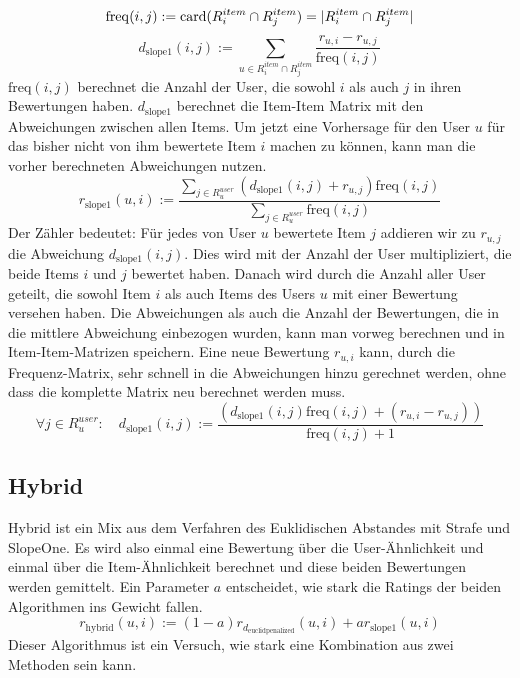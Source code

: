 \begin{equation}
\mathrm{freq}(i,j) := \mathrm{card}(R^{item}_{i} \cap R^{item}_{j})=|R^{item}_{i} \cap R^{item}_{j}|\\
\end{equation}
\begin{equation}
 d_{\mathrm{slope1}}(i,j) := \sum\limits_{u\in R^{item}_{i} \cap R^{item}_{j}}\dfrac{r_{u,i}-r_{u,j}}  {\mathrm{freq}(i,j)} 	\label{deviation}
\end{equation}	
$\mathrm{freq}(i,j)$ berechnet die Anzahl der User, die sowohl $i$ als auch $j$ in ihren Bewertungen haben. $d_{\mathrm{slope1}}$ berechnet die Item-Item Matrix mit den Abweichungen zwischen allen Items. 
Um jetzt eine Vorhersage für den User $u$ für das bisher nicht von ihm bewertete Item $i$ machen zu können, kann man die vorher berechneten Abweichungen nutzen.
\begin{equation}
 r_{\mathrm{slope1}}(u,i) := \dfrac{\sum\limits_{j\in R^{user}_{u}}( d_{\mathrm{slope1}}(i,j)+r_{u,j})\mathrm{freq}(i,j)}  {\sum\limits_{j\in R^{user}_{u}}\mathrm{freq}(i,j)} 	\label{slopeone}
\end{equation}
Der Zähler bedeutet: Für jedes von User $u$ bewertete Item $j$ addieren wir zu $r_{u,j}$ die Abweichung $d_{\mathrm{slope1}}(i,j)$. Dies wird mit der Anzahl der User multipliziert, die beide Items $i$ und $j$ bewertet haben. Danach wird durch die Anzahl aller User geteilt, die sowohl Item $i$ als auch Items des Users $u$ mit einer Bewertung versehen haben. Die Abweichungen als auch die Anzahl der Bewertungen, die in die mittlere Abweichung einbezogen wurden, kann man vorweg berechnen und in Item-Item-Matrizen speichern. Eine neue Bewertung $r_{u,i}$ kann, durch die Frequenz-Matrix, sehr schnell in die Abweichungen hinzu gerechnet werden, ohne dass die komplette Matrix neu berechnet werden muss.
	\begin{equation}
\forall j\in R^{user}_{u}:\quad d_{\mathrm{slope1}}(i,j) := \dfrac{(d_{\mathrm{slope1}}(i,j)\mathrm{freq}(i,j)+(r_{u,i}-r_{u,j}))}  {\mathrm{freq}(i,j)+1} 	\label{slopeoneadd}
	\end{equation}

\subsection{Hybrid}\label{s.hybrid}
Hybrid ist ein Mix aus dem Verfahren des Euklidischen Abstandes mit Strafe und SlopeOne. Es wird also einmal eine Bewertung über die User-Ähnlichkeit und einmal über die Item-Ähnlichkeit berechnet und diese beiden Bewertungen werden gemittelt. Ein Parameter $a$ entscheidet, wie stark die Ratings der beiden Algorithmen ins Gewicht fallen.
\begin{equation}
r_{\mathrm{hybrid}}(u,i) := (1-a)r_{d_{\mathrm{euclidpenalized}}}(u,i) + a r_{\mathrm{slope1}}(u,i)  	\label{hybridrating}
\end{equation}
Dieser Algorithmus ist ein Versuch, wie stark eine Kombination aus zwei Methoden sein kann. 
	
